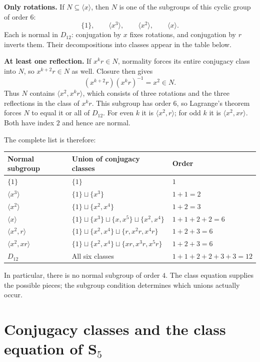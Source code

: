 \documentclass[reqno,11pt]{amsart}
\begin{document}
\textbf{Only rotations.}
If $N\subseteq\langle x\rangle$, then $N$ is one of the subgroups
of this cyclic group of order $6$:
\[
  \{1\},\qquad \langle x^3\rangle,\qquad
  \langle x^2\rangle,\qquad \langle x\rangle.
\]
Each is normal in $D_{12}$: conjugation by $x$ fixes rotations,
and conjugation by $r$ inverts them. Their decompositions into
classes appear in the table below.

\textbf{At least one reflection.}
If $x^kr\in N$, normality forces its entire conjugacy class into
$N$, so $x^{k+2}r\in N$ as well. Closure then gives
\[
  (x^{k+2}r)(x^kr)^{-1}=x^2\in N.
\]
Thus $N$ contains $\langle x^2,x^kr\rangle$, which consists of
three rotations and the three reflections in the class of $x^kr$.
This subgroup has order $6$, so Lagrange's theorem forces $N$
to equal it or all of $D_{12}$. For even $k$ it is
$\langle x^2,r\rangle$; for odd $k$ it is $\langle x^2,xr\rangle$.
Both have index $2$ and hence are normal.

The complete list is therefore:
\begin{center}
\small
\begin{tabular}{lll}
  \textbf{Normal subgroup} & \textbf{Union of conjugacy classes} & \textbf{Order}\\ \hline
  $\{1\}$ & $\{1\}$ & $1$\\[4pt]
  $\langle x^3\rangle$ & $\{1\}\sqcup\{x^3\}$ & $1+1=2$\\[4pt]
  $\langle x^2\rangle$ & $\{1\}\sqcup\{x^2,x^4\}$ & $1+2=3$\\[4pt]
  $\langle x\rangle$ & $\{1\}\sqcup\{x^3\}\sqcup\{x,x^5\}\sqcup\{x^2,x^4\}$ & $1+1+2+2=6$\\[4pt]
  $\langle x^2,r\rangle$ & $\{1\}\sqcup\{x^2,x^4\}\sqcup\{r,x^2r,x^4r\}$ & $1+2+3=6$\\[4pt]
  $\langle x^2,xr\rangle$ & $\{1\}\sqcup\{x^2,x^4\}\sqcup\{xr,x^3r,x^5r\}$ & $1+2+3=6$\\[4pt]
  $D_{12}$ & All six classes & $1+1+2+2+3+3=12$
\end{tabular}
\end{center}
In particular, there is no normal subgroup of order $4$.
The class equation supplies the possible pieces; the subgroup
condition determines which unions actually occur.

\section{Conjugacy classes and the class equation of S\texorpdfstring{$_5$}{5}}
\end{document}
